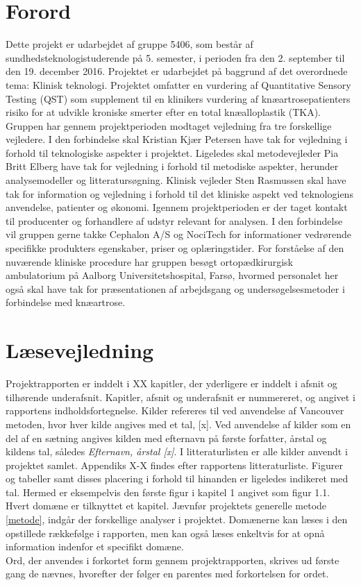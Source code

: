 \section*{Forord}
Dette projekt er udarbejdet af gruppe 5406, som består af sundhedsteknologistuderende på 5. semester, i perioden fra den 2. september til den 19. december 2016. Projektet er udarbejdet på baggrund af det overordnede tema: Klinisk teknologi. Projektet omfatter en vurdering af Quantitative Sensory Testing (QST) som supplement til en klinikers vurdering af knæartrosepatienters risiko for at udvikle kroniske smerter efter en total knæalloplastik (TKA). Gruppen har gennem projektperioden modtaget vejledning fra tre forskellige vejledere. I den forbindelse skal Kristian Kjær Petersen have tak for vejledning i forhold til teknologiske aspekter i projektet. Ligeledes skal metodevejleder Pia Britt Elberg have tak for vejledning i forhold til metodiske aspekter, herunder analysemodeller og litteratursøgning. Klinisk vejleder Sten Rasmussen skal have tak for information og vejledning i forhold til det kliniske aspekt ved teknologiens anvendelse, patienter og økonomi. Igennem projektperioden er der taget kontakt til producenter og forhandlere af udstyr relevant for analysen. I den forbindelse vil gruppen gerne takke Cephalon A/S og NociTech for informationer vedrørende specifikke produkters egenskaber, priser og oplæringstider. For forståelse af den nuværende kliniske procedure har gruppen besøgt ortopædkirurgisk ambulatorium på Aalborg Universitetshospital, Farsø, hvormed personalet her også skal have tak for præsentationen af arbejdsgang og undersøgelsesmetoder i forbindelse med knæartrose.


\section*{Læsevejledning}
Projektrapporten er inddelt i XX kapitler, der yderligere er inddelt i afsnit og tilhørende underafsnit. Kapitler, afsnit og underafsnit er nummereret, og angivet i rapportens indholdsfortegnelse. Kilder refereres til ved anvendelse af Vancouver metoden, hvor hver kilde angives med et tal, [x]. Ved anvendelse af kilder som en del af en sætning angives kilden med efternavn på første forfatter, årstal og kildens tal, således \textit{Efternavn, årstal [x]}. I litteraturlisten er alle kilder anvendt i projektet samlet. Appendiks X-X findes efter rapportens litteraturliste.
Figurer og tabeller samt disses placering i forhold til hinanden er ligeledes indikeret med tal. Hermed er eksempelvis den første figur i kapitel 1 angivet som figur 1.1. Hvert domæne er tilknyttet et kapitel. Jævnfør projektets generelle metode \ref{metode}, indgår der forskellige analyser i projektet. Domænerne kan læses i den opstillede rækkefølge i rapporten, men kan også læses enkeltvis for at opnå information indenfor et specifikt domæne.\\
Ord, der anvendes i forkortet form gennem projektrapporten, skrives ud første gang de nævnes, hvorefter der følger en parentes med forkortelsen for ordet.